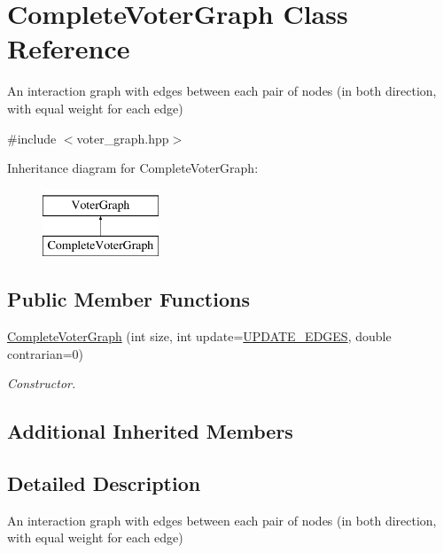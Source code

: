 \hypertarget{class_complete_voter_graph}{\section{Complete\-Voter\-Graph Class Reference}
\label{class_complete_voter_graph}
}


An interaction graph with edges between each pair of nodes (in both direction, with equal weight for each edge)  




{\ttfamily \#include $<$voter\-\_\-graph.\-hpp$>$}

Inheritance diagram for Complete\-Voter\-Graph\-:\begin{figure}[H]
\begin{center}
\leavevmode
\includegraphics[height=2.000000cm]{class_complete_voter_graph}
\end{center}
\end{figure}
\subsection*{Public Member Functions}
\begin{DoxyCompactItemize}
\item 
\hyperlink{class_complete_voter_graph_a0adf42ee4826aa54e1a13d9b8d770554}{Complete\-Voter\-Graph} (int size, int update=\hyperlink{voter__graph_8hpp_ab3bec55c359e4ed771339c8bc61fc35aa01d100088352e1a7d3a34c9a66d0f951}{U\-P\-D\-A\-T\-E\-\_\-\-E\-D\-G\-E\-S}, double contrarian=0)
\begin{DoxyCompactList}\small\item\em Constructor. \end{DoxyCompactList}\end{DoxyCompactItemize}
\subsection*{Additional Inherited Members}


\subsection{Detailed Description}
An interaction graph with edges between each pair of nodes (in both direction, with equal weight for each edge) 

